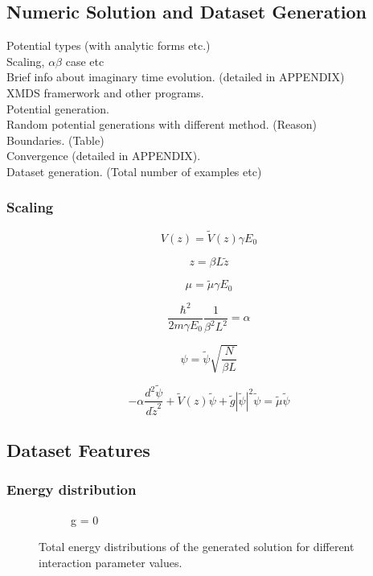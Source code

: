 \documentclass[a4paper,times,12pt]{article}
\begin{document}
\subsection{Numeric Solution and Dataset Generation}
\noindent 
Potential types (with analytic forms etc.)\\ 
Scaling, $\alpha \beta$ case etc \\
Brief info about imaginary time evolution. (detailed in APPENDIX)\\
XMDS framerwork and other programs.\\
Potential generation.\\
Random potential generations with different method. (Reason)\\ 
Boundaries. (Table)\\
Convergence (detailed in APPENDIX).\\
Dataset generation. (Total number of examples etc)\\    

\subsubsection{Scaling}

$$ V(z) = \widetilde{V}(z)\gamma E_0 $$

$$z = \beta L\widetilde{z}$$

$$\mu =  \widetilde{\mu}\gamma E_0$$

$$ \frac{\hbar^2}{2m\gamma E_0} \frac{1}{\beta^2 L^2} = \alpha $$

$$ \psi = \widetilde{\psi}\sqrt{\frac{N}{\beta L}}  $$


\begin{equation}
    \label{eq:GPE_dimensionless}
    -\alpha\frac{d^2\widetilde{\psi}}{d\widetilde{z}^2} + \widetilde{V}(z)\widetilde{\psi} + \widetilde{g}|\widetilde{\psi}|^2 \widetilde{\psi} = \widetilde{\mu} \widetilde{\psi}
\end{equation}
    
\subsection{Dataset Features}
\subsubsection{Energy distribution}

\begin{figure}[H]
    \centering
    \begin{subfigure}[t]{0.45\textwidth}
        
        \caption{g = 0}
		\label{fig:a}
    \end{subfigure}
    \caption{Total energy distributions of the generated solution for different interaction parameter values.}
\label{fig:energy_dist}
\end{figure}
\end{document}
